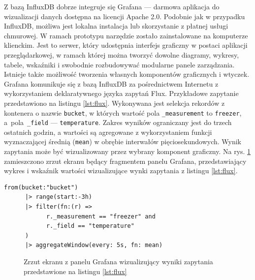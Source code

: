 \documentclass[a4paper, 12pt, twoside]{article}
\begin{document}
Z bazą InfluxDB dobrze integruje się Grafana --- darmowa aplikacja do wizualizacji
danych dostępna na licencji Apache 2.0. Podobnie jak
w przypadku InfluxDB, możliwa jest lokalna instalacja lub skorzystanie z
płatnej usługi chmurowej. W ramach prototypu narzędzie zostało zainstalowane
na komputerze klienckim. Jest to serwer, który udostępnia interfejs graficzny
w postaci aplikacji przeglądarkowej, w ramach której można tworzyć
dowolne diagramy, wykresy, tabele, wskaźniki i swobodnie rozbudowywać
modularne panele zarządzania. Istnieje także możliwość tworzenia własnych komponentów
graficznych i wtyczek.
Grafana komunikuje się z bazą InfluxDB za pośrednictwem Internetu z wykorzystaniem
deklaratywnego języka zapytań Flux. Przykładowe zapytanie przedstawiono na
listingu \ref{lst:flux}. Wykonywana jest selekcja
rekordów z kontenera o nazwie \texttt{bucket}, w których wartość pola
\texttt{\_measurement} to \texttt{freezer}, a~pola~\texttt{\_field} --- \texttt{temperature}.
Zakres wyników ograniczany jest do trzech ostatnich godzin, a wartości
są agregowane z wykorzystaniem funkcji wyznaczającej średnią (\texttt{mean}) w obrębie interwałów
pięciosekundowych. Wynik zapytania może być wizualizowany przez wybrany komponent
graficzny. Na rys. \ref{fig:grafana-1} zamieszczono zrzut ekranu będący fragmentem panelu Grafana,
przedstawiający wykres i wskaźnik wartości wizualizujące wynki zapytania z listingu \ref{lst:flux}.


\begin{lstlisting}[caption={Przykładowe zapytanie w języku Flux}, label={lst:flux}]
from(bucket:"bucket")
      |> range(start:-3h)
      |> filter(fn:(r) =>
            r._measurement == "freezer" and
            r._field == "temperature"
      )
      |> aggregateWindow(every: 5s, fn: mean)
\end{lstlisting}

\begin{figure}[h]
      \centering
      \caption{Zrzut ekranu z panelu Grafana wizualizujący wyniki zapytania przedstawione na listingu \ref{lst:flux}}
      \label{fig:grafana-1}
\end{figure}
\end{document}
